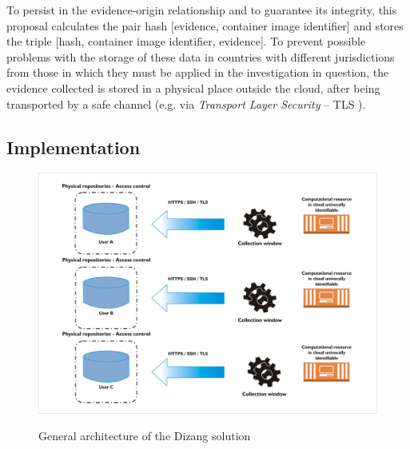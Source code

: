 \documentclass[conference]{IEEEtran}
\newcommand{\fancyname}{Dizang }
\begin{document}
To persist in the evidence-origin relationship and to guarantee its integrity, this proposal calculates the pair hash [evidence, container image identifier] and stores the triple [hash, container image identifier, evidence].
%
To prevent possible problems with the storage of these data in countries with different jurisdictions from those in which they must be applied in the investigation in question, the evidence collected is stored in a physical place outside the cloud, after being transported by a safe channel (e.g. via \textit{Transport Layer Security} – TLS \cite{DierksT2008}).
%

\subsection{Implementation}
\label{sec:proposal-impl}

\begin{figure}[htb!]
\footnotesize
\caption{General architecture of the \fancyname solution}
\includegraphics[scale=0.28]{solucao-eng.jpg}
\centering
\label{fig:Solucao}
\end{figure}
\end{document}
